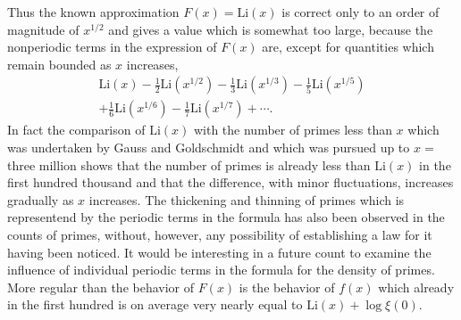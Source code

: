 Thus the known approximation $F(x) = \text{Li}(x)$ is correct only to an order
of magnitude of $x^{1/2}$ and gives a value which is somewhat too large, because
the nonperiodic terms in the expression of $F(x)$ are, except for quantities
which remain bounded as $x$ increases, 
%
\begin{align*}
\text{Li}(x) - \frac{1}{2}\text{Li}(x^{1/2}) - \frac{1}{3}\text{Li}(x^{1/3})
- \frac{1}{5}\text{Li}(x^{1/5}) \\ 
+ \frac{1}{6}\text{Li}(x^{1/6}) - \frac{1}{7}\text{Li}(x^{1/7}) + \cdots.
\end{align*}
%
In fact the comparison of $\text{Li}(x)$ with the number of primes less than
$x$ which was undertaken by Gauss and Goldschmidt and which was pursued up
to $x=$ three million shows that the number of primes is already less than
$\text{Li}(x)$ in the first hundred thousand and that the difference, with
minor fluctuations, increases gradually as $x$ increases. The thickening
and thinning of primes which is representend by the periodic terms in the
formula has also been observed in the counts of primes, without, however, any
possibility of establishing a law for it having been noticed. It would be
interesting in a future count to examine the influence of individual periodic
terms in the formula for the density of primes. More regular than the behavior
of $F(x)$ is the behavior of $f(x)$ which already in the first hundred is on
average very nearly equal to $\text{Li}(x) + \log\xi(0)$.